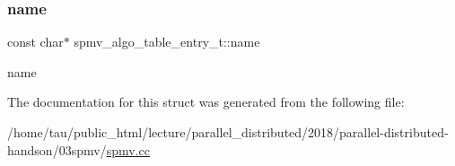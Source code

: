 \subsubsection{\texorpdfstring{name}{name}}
{\footnotesize\ttfamily const char$\ast$ spmv\+\_\+algo\+\_\+table\+\_\+entry\+\_\+t\+::name}

name 

The documentation for this struct was generated from the following file\+:\begin{DoxyCompactItemize}
\item 
/home/tau/public\+\_\+html/lecture/parallel\+\_\+distributed/2018/parallel-\/distributed-\/handson/03spmv/\hyperlink{spmv_8cc}{spmv.\+cc}\end{DoxyCompactItemize}
